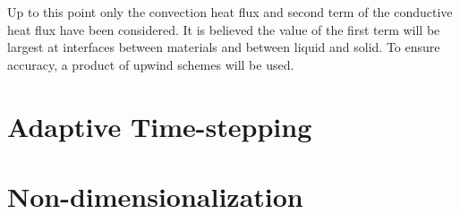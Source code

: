\documentclass[]{article}
\begin{document}
Up to this point only the convection heat flux and second term of the conductive heat flux have been considered. It is believed the value of the first term will be largest at interfaces between materials and between liquid and solid. To ensure accuracy, a product of upwind schemes will be used.

\section{Adaptive Time-stepping}

\section{Non-dimensionalization}
\end{document}
